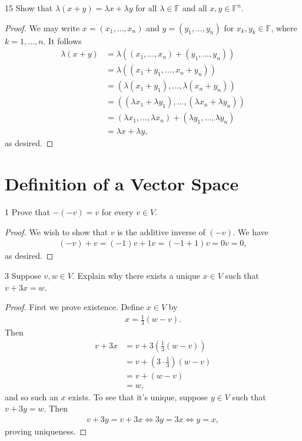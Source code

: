 \documentclass{extarticle}
\newenvironment{problem}[1]{\begin{prob*}{#1}{}}{\end{prob*}}
\newcommand{\F}{\mathbb{F}}
\begin{document}
\begin{problem}{15}
Show that $\lambda(x + y)=\lambda x +\lambda y$ for all $\lambda\in\F$ and all $x,y\in\F^n$.
\end{problem}
\begin{proof}
We may write $x = (x_1, \dots, x_n)$ and $y = (y_1,\dots,y_n)$ for $x_k,y_k\in\F$, where $k=1,\dots,n$.  It follows
\begin{align*}
\lambda(x+y) &= \lambda( (x_1,\dots,x_n) + (y_1,\dots,y_n) )\\
&= \lambda ( (x_1 + y_1, \dots, x_n + y_n) )\\
&= (\lambda (x_1 + y_1), \dots, \lambda(x_n + y_n) )\\
&= ((\lambda x_1 + \lambda y_1), \dots, (\lambda x_n + \lambda y_n))\\
&= (\lambda x_1, \dots, \lambda x_n) + (\lambda y_1, \dots, \lambda y_n)\\
&= \lambda x + \lambda y,
\end{align*}
as desired.
\end{proof}


\section{Definition of a Vector Space}

\begin{problem}{1}
Prove that $-(-v)=v$ for every $v\in V$.
\end{problem}
\begin{proof}
We wish to show that $v$ is the additive inverse of $(-v)$.  We have
\begin{align*}
(-v) + v = (-1)v + 1v = (-1 + 1)v = 0v = 0,
\end{align*}
as desired.
\end{proof}

\begin{problem}{3}
Suppose $v,w\in V$.  Explain why there exists a unique $x\in V$ such that $v + 3x = w$.
\end{problem}
\begin{proof}
First we prove existence.  Define $x\in V$ by
\begin{align*}
x = \frac{1}{3}(w - v).
\end{align*}
Then
\begin{align*}
v + 3x &= v + 3\left( \frac{1}{3}(w - v)\right) \\
&= v + \left(3 \cdot \frac{1}{3}\right)(w-v)\\
&= v + (w - v)\\
&= w,
\end{align*}
and so such an $x$ exists.  To see that it's unique, suppose $y\in V$ such that $v + 3y = w$.  Then
\begin{align*}
v + 3y = v + 3x \iff 3y = 3x \iff y = x,
\end{align*}
proving uniqueness.
\end{proof}
\end{document}
